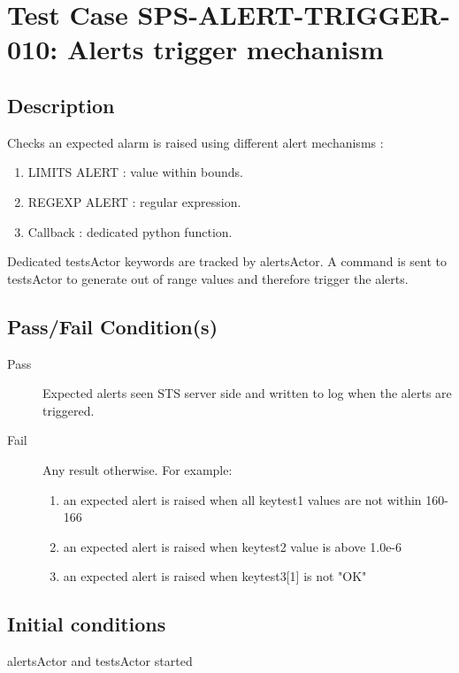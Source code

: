 \section{Test Case SPS-ALERT-TRIGGER-010: Alerts trigger mechanism}

\subsection{Description}

Checks an expected alarm is raised using different alert mechanisms :
\begin{enumerate}
    \item LIMITS ALERT :  value within bounds.
    \item REGEXP ALERT : regular expression.
    \item Callback : dedicated python function.
\end{enumerate}

Dedicated testsActor keywords are tracked by alertsActor.
A command is sent to testsActor to generate out of range values and therefore trigger the alerts.


\subsection{Pass/Fail Condition(s)}

\begin{description}
\item [Pass] Expected alerts seen STS server side and written to log when the alerts are triggered.
\item [Fail] Any result otherwise. For example:

\begin{enumerate}
    \item an expected alert is raised when all keytest1 values are not within 160-166
    \item an expected alert is raised when keytest2 value is above 1.0e-6
    \item an expected alert is raised when keytest3[1] is not "OK"
\end{enumerate}
\end{description}


\subsection{Initial conditions}

alertsActor and testsActor started

